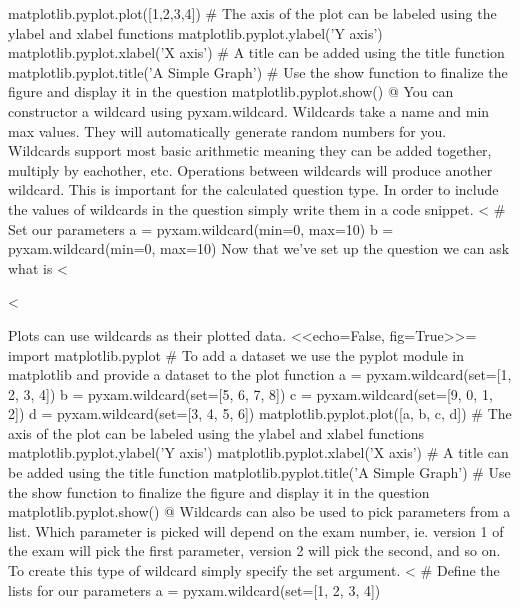 \documentclass[12pt]{exam}
\begin{document}
\begin{questions}
matplotlib.pyplot.plot([1,2,3,4])
# The axis of the plot can be labeled using the ylabel and xlabel functions
matplotlib.pyplot.ylabel('Y axis')
matplotlib.pyplot.xlabel('X axis')
# A title can be added using the title function
matplotlib.pyplot.title('A Simple Graph')
# Use the show function to finalize the figure and display it in the question
matplotlib.pyplot.show()
@
                You can constructor a wildcard using pyxam.wildcard. Wildcards take a name and min max values. They will
                automatically generate random numbers for you. Wildcards support most basic arithmetic meaning they can
                be added together, multiply by eachother, etc. Operations between wildcards will produce another
                wildcard. This is important for the calculated question type. In order to include the values of
                wildcards in the question simply write them in a code snippet.
<%
# Set our parameters
a = pyxam.wildcard(min=0, max=10)
b = pyxam.wildcard(min=0, max=10)
                Now that we've set up the question we can ask what is <%
                \begin{solution}
                    <%
                \end{solution}
                Plots can use wildcards as their plotted data.
<<echo=False, fig=True>>=
import matplotlib.pyplot
# To add a dataset we use the pyplot module in matplotlib and provide a dataset to the plot function
a = pyxam.wildcard(set=[1, 2, 3, 4])
b = pyxam.wildcard(set=[5, 6, 7, 8])
c = pyxam.wildcard(set=[9, 0, 1, 2])
d = pyxam.wildcard(set=[3, 4, 5, 6])
matplotlib.pyplot.plot([a, b, c, d])
# The axis of the plot can be labeled using the ylabel and xlabel functions
matplotlib.pyplot.ylabel('Y axis')
matplotlib.pyplot.xlabel('X axis')
# A title can be added using the title function
matplotlib.pyplot.title('A Simple Graph')
# Use the show function to finalize the figure and display it in the question
matplotlib.pyplot.show()
@
                Wildcards can also be used to pick parameters from a list. Which parameter is picked will depend on the
                exam number, ie. version 1 of the exam will pick the first parameter, version 2 will pick the second,
                and so on. To create this type of wildcard simply specify the set argument.
<%
# Define the lists for our parameters
a = pyxam.wildcard(set=[1, 2, 3, 4])

\end{questions}
\end{document}
